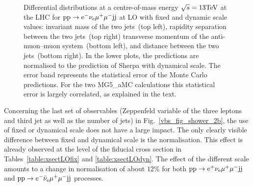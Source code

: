 \documentclass[11pt]{cernrep}
\begin{document}
\begin{figure}[htbp]
\begin{center}
\caption{Differential distributions at a centre-of-mass energy $\sqrt{s}=13{\rm TeV}$ at the LHC for ${\rm p} {\rm p}
  \to {\rm e}^-  \nu_{\rm e}  \mu^+ \mu^- {\rm j} {\rm j}$ at LO with fixed and dynamic scale values:  
                invariant mass of the two jets~(top left),
                rapidity separation between the two jets~(top right)
                transverse momentum of the anti-muon--muon system~(bottom left), and
                distance between the two jets~(bottom right).
                In the lower plots, the predictions are normalised to the prediction of {\sc Sherpa} with
                dynamical scale. The error band represents
                the statistical error of the Monte Carlo predictions. For the two {\sc MG5\_aMC}
                calculations this statistical error is largely correlated, as explained in the text.}
\label{vbs_fig_shower_2a}
\end{center}
\end{figure}

Concerning the last set of observables (Zeppenfeld variable of the three leptons and third jet as well as the number of jets) in Fig.~\ref{vbs_fig_shower_2b}, the use of fixed or dynamical scale does not have a large impact.
The only clearly visible difference between fixed and dynamical scale is the normalisation.
This effect is already observed at the level of the fiducial cross section in Tables~\ref{table:xsectLOfix} and \ref{table:xsectLOdyn}.
The effect of the different scale amounts to a change in normalisation of about $12\%$ for both ${\rm p}{\rm p}\to{\rm e}^+\nu_{\rm e}\mu^+\mu^-{\rm j}{\rm j}$ and ${\rm p}{\rm p}\to{\rm e}^-\bar\nu_{\rm e}\mu^+\mu^-{\rm j}{\rm j}$ processes.
\end{document}
